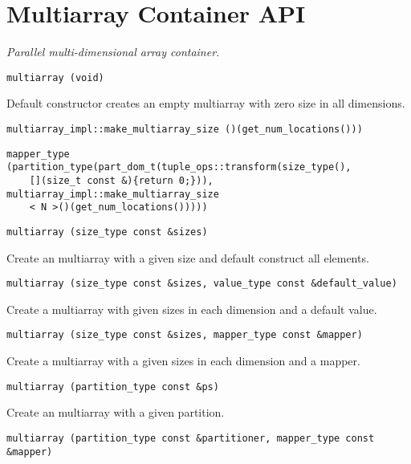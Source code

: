 
\section{ Multiarray Container API  } \label{sec-multi-cont}

\emph{ Parallel multi-dimensional array container.  }

\begin{verbatim}
multiarray (void)
\end{verbatim}

Default constructor creates an empty multiarray with zero size in all dimensions.
 
\begin{verbatim}
multiarray_impl::make_multiarray_size ()(get_num_locations()))
\end{verbatim}
 
\begin{verbatim}
mapper_type (partition_type(part_dom_t(tuple_ops::transform(size_type(),
    [](size_t const &){return 0;})), multiarray_impl::make_multiarray_size
    < N >()(get_num_locations()))))
\end{verbatim}
 
\begin{verbatim}
multiarray (size_type const &sizes)
\end{verbatim}

Create an multiarray with a given size and default construct all elements. 
 
\begin{verbatim}
multiarray (size_type const &sizes, value_type const &default_value)
\end{verbatim}

Create a multiarray with given sizes in each dimension and a default value. 
 
\begin{verbatim}
multiarray (size_type const &sizes, mapper_type const &mapper)
\end{verbatim}

Create a multiarray with a given sizes in each dimension and a mapper. 
 
\begin{verbatim}
multiarray (partition_type const &ps)
\end{verbatim}

Create an multiarray with a given partition. 
 
\begin{verbatim}
multiarray (partition_type const &partitioner, mapper_type const &mapper)
\end{verbatim}

